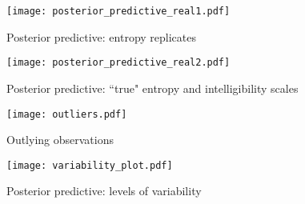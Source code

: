%
\begin{figure}
	\centering
	\texttt{[image: posterior\_predictive\_real1.pdf]}
	\caption[Posterior predictive: entropy replicates]{Posterior predictive: entropy replicates}
	\label{fig:predictive1}
\end{figure}
%
\begin{figure}
	\centering
	\texttt{[image: posterior\_predictive\_real2.pdf]}
	\caption[Posterior predictive: ``true'' entropy and intelligibility scales]{Posterior predictive: ``true" entropy and intelligibility scales}
	\label{fig:predictive2}
\end{figure}
%
\begin{figure}
	\centering
	\texttt{[image: outliers.pdf]}
	\caption[Outlying observations]{Outlying observations}
	\label{fig:outliers}
\end{figure}
%
\begin{figure}
	\centering
	\texttt{[image: variability\_plot.pdf]}
	\caption[Posterior predictive: levels of variability]{Posterior predictive: levels of variability}
	\label{fig:variability}
\end{figure}